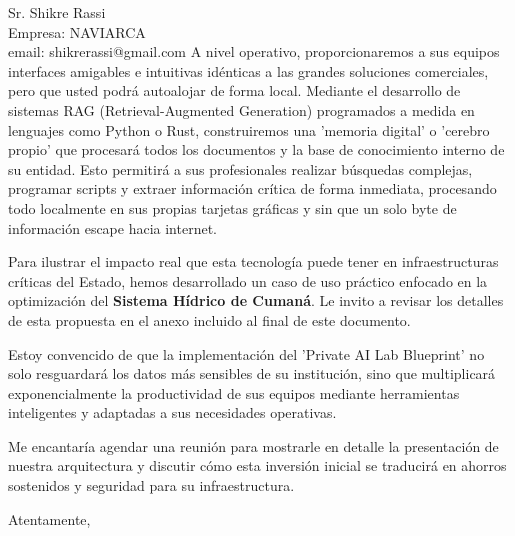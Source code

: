 \documentclass[11pt,a4paper]{letter}
\begin{document}
\begin{letter}{Sr. Shikre Rassi \\ Empresa: NAVIARCA \\email: shikrerassi@gmail.com}
A nivel operativo, proporcionaremos a sus equipos interfaces amigables e intuitivas idénticas a las grandes soluciones comerciales, pero que usted podrá autoalojar de forma local. Mediante el desarrollo de sistemas RAG (Retrieval-Augmented Generation) programados a medida en lenguajes como Python o Rust, construiremos una 'memoria digital' o 'cerebro propio' que procesará todos los documentos y la base de conocimiento interno de su entidad. Esto permitirá a sus profesionales realizar búsquedas complejas, programar scripts y extraer información crítica de forma inmediata, procesando todo localmente en sus propias tarjetas gráficas y sin que un solo byte de información escape hacia internet.

Para ilustrar el impacto real que esta tecnología puede tener en infraestructuras críticas del Estado, hemos desarrollado un caso de uso práctico enfocado en la optimización del \textbf{Sistema Hídrico de Cumaná}. Le invito a revisar los detalles de esta propuesta en el anexo incluido al final de este documento.

Estoy convencido de que la implementación del 'Private AI Lab Blueprint' no solo resguardará los datos más sensibles de su institución, sino que multiplicará exponencialmente la productividad de sus equipos mediante herramientas inteligentes y adaptadas a sus necesidades operativas.

Me encantaría agendar una reunión para mostrarle en detalle la presentación de nuestra arquitectura y discutir cómo esta inversión inicial se traducirá en ahorros sostenidos y seguridad para su infraestructura.

\closing{Atentamente,}

\end{letter}

\end{document}
